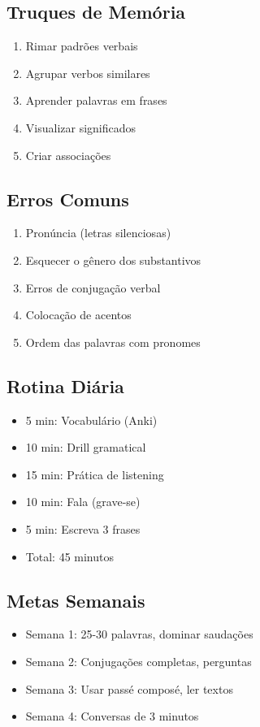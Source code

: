 \documentclass[a4paper,12pt]{article}
\begin{document}
\subsection{Truques de Memória}
\begin{enumerate}
    \item Rimar padrões verbais
    \item Agrupar verbos similares
    \item Aprender palavras em frases
    \item Visualizar significados
    \item Criar associações
\end{enumerate}
\subsection{Erros Comuns}
\begin{enumerate}
    \item Pronúncia (letras silenciosas)
    \item Esquecer o gênero dos substantivos
    \item Erros de conjugação verbal
    \item Colocação de acentos
    \item Ordem das palavras com pronomes
\end{enumerate}
\subsection{Rotina Diária}
\begin{itemize}
    \item 5 min: Vocabulário (Anki)
    \item 10 min: Drill gramatical
    \item 15 min: Prática de listening
    \item 10 min: Fala (grave-se)
    \item 5 min: Escreva 3 frases
    \item Total: 45 minutos
\end{itemize}
\subsection{Metas Semanais}
\begin{itemize}
    \item Semana 1: 25-30 palavras, dominar saudações
    \item Semana 2: Conjugações completas, perguntas
    \item Semana 3: Usar passé composé, ler textos
    \item Semana 4: Conversas de 3 minutos
\end{itemize}
\end{document}
